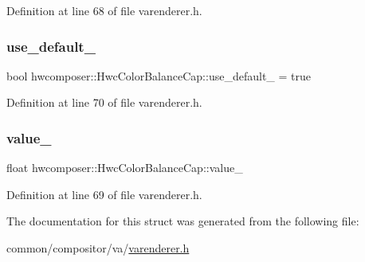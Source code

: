 Definition at line 68 of file varenderer.\+h.

\mbox{\label{structhwcomposer_1_1HwcColorBalanceCap_a6f1a302a943743d07f51a79da718c646}} 
\subsubsection{\texorpdfstring{use\+\_\+default\+\_\+}{use\_default\_}}
{\footnotesize\ttfamily bool hwcomposer\+::\+Hwc\+Color\+Balance\+Cap\+::use\+\_\+default\+\_\+ = true}



Definition at line 70 of file varenderer.\+h.

\mbox{\label{structhwcomposer_1_1HwcColorBalanceCap_a1f01561c63da1f130bb07682ae9fec34}} 
\subsubsection{\texorpdfstring{value\+\_\+}{value\_}}
{\footnotesize\ttfamily float hwcomposer\+::\+Hwc\+Color\+Balance\+Cap\+::value\+\_\+}



Definition at line 69 of file varenderer.\+h.



The documentation for this struct was generated from the following file\+:\begin{DoxyCompactItemize}
\item 
common/compositor/va/\mbox{\hyperlink{varenderer_8h}{varenderer.\+h}}\end{DoxyCompactItemize}
